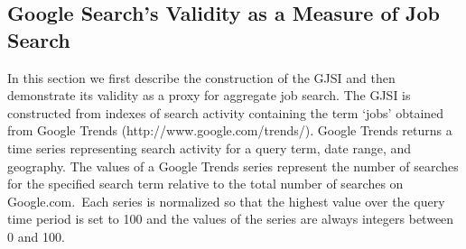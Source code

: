 \documentclass[12pt]{article}
\begin{document}
\begin{spacing}{2}


\section{Google Search's Validity as a Measure of Job Search}\label{sec:validity}
In this section we first describe the construction of the GJSI and then demonstrate its validity as a proxy for aggregate job search. The GJSI is constructed from indexes of search activity containing the term `jobs' obtained from Google Trends (http://www.google.com/trends/). Google Trends returns a time series representing search activity for a query term, date range, and geography. The values of a Google Trends series represent the number of searches for the specified search term relative to the total number of searches on Google.com.\footnotemark \ Each series is normalized so that the highest value over the query time period is set to 100 and the values of the series are always integers between 0 and 100.



\end{spacing}
\end{document}
